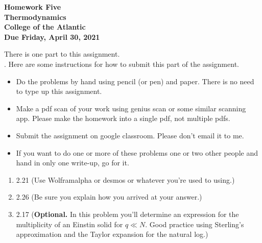 \documentclass[12pt]{article}
\begin{document}
\pagestyle{empty}
 
\begin{center}
{\LARGE {\bf Homework Five}}\\
\bigskip
{\Large {\bf Thermodynamics}}\\
\bigskip
{\Large {\bf College of the Atlantic}}\\
\bigskip
{ {\bf Due Friday, April 30, 2021}}\\ 
\end{center}
\medskip


\noindent There is one part to this assignment.\\


.  Here are some
instructions for how to submit this part of the assignment.
\begin{itemize}
  \setlength{\itemsep}{1mm}
\item Do the problems by hand using pencil (or pen) and paper.
  There is no need to type up this assignment.
\item Make a pdf scan of your work using genius scan or some
  similar scanning app.  Please make the homework into a single
  pdf, not multiple pdfs.
\item Submit the assignment on google classroom.  Please don't
  email it to me. 
\item If you want to do one or more of these problems one or two other
  people and hand in only one write-up, go for it. \\
\end{itemize}


\begin{enumerate}
\setlength{\itemsep}{1mm}
\item 2.21 (Use Wolframalpha or desmos or whatever you're used to using.)
\item 2.26 (Be sure you explain how you arrived at your answer.)
\item 2.17 ({\bf Optional.} In this problem you'll determine an
  expression for the multiplicity of an Einstin solid for $q \ll N$.
  Good practice using Sterling's approximation and the Taylor
  expansion for the natural log.)


\end{enumerate}
\end{document}
